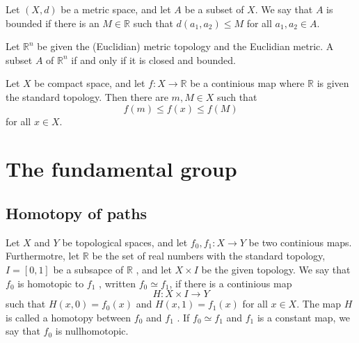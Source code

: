 \documentclass{article}
\theoremstyle{remark}
\begin{document}
\begin{definition}

    Let $\left( X,d \right) $ be a metric space, and let $A$ be a subset of $X$. We say that $A$ is bounded if there is
    an $M  \in  \mathbb{R} $ such that $d\left( a_{1}, a_{2} \right) \le M$ for all $a_{1}, a_{2} \in  A$.

\end{definition}

\begin{theorem}
    Let $\mathbb{R} ^{n}$ be given the (Euclidian) metric topology and the Euclidian metric. A subset $A$ of $\mathbb{R}
    ^{n}$ if and only if it is closed and bounded.

\end{theorem}


\begin{theorem}

    Let $X$ be compact space, and let $f: X \to  \mathbb{R} $ be a continious map where $ \mathbb{R} $ is given the
    standard topology.  Then there are $m, M \in X $ such that \[
    f\left( m \right) \le f\left( x \right) \le f\left( M \right)
    \]
    for all $x \in   X$.
\end{theorem}
\section{ The fundamental group}%
\label{sec:the_fundamental_group}

\subsection{Homotopy of paths}%
\label{sub:homotopy_of_paths}



\begin{definition}[Homotopy]
    Let $X$  and $Y$ be topological spaces, and let $f_{0}, f_{1}: X \to Y$ be two continious maps. Furthermotre, let
    $\mathbb{R} $  be the set of real numbers with the standard topology, $I = \left[ 0,1 \right]$ be a subsapce of
    $\mathbb{R} $ , and let $X \times I$ be the given topology. We say that $f_{0}$ is homotopic to $f_{1}$ , written
    $ f_{0} \simeq f_{1}$, if there is a continious map \[
    H: X \times I \to Y
    \]
    such that $H\left( x,0 \right) = f_{0}\left( x \right)$  and $H\left( x,1 \right) = f_{1}\left( x \right)$ for all
    $x \in  X$. The map $H$ is called a homotopy between $f_{0}$  and $f_{1}$ . If $ f_{0} \simeq  f_{1} $ and $f_{1}$
    is a constant map, we say that $f_{0}$ is nullhomotopic.
\end{definition}
\end{document}
